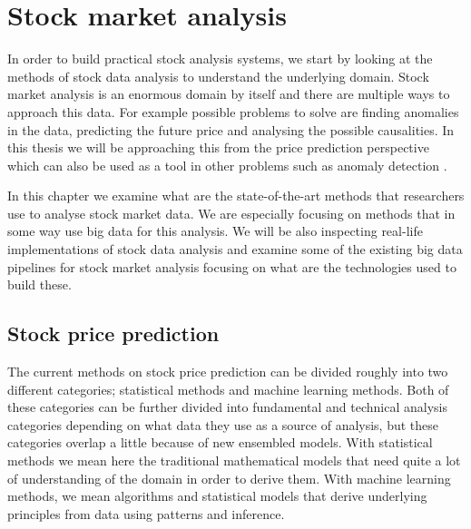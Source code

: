 \chapter{Stock market analysis}
\label{chapter:background} 



In order to build practical stock analysis systems, we start by looking at the methods of stock data analysis to understand the underlying domain.
Stock market analysis is an enormous domain by itself and there are multiple ways to approach this data.
For example possible problems to solve are finding anomalies in the data, predicting the future price and analysing the possible causalities.
In this thesis we will be approaching this from the price prediction perspective which can also be used as a tool in other problems such as anomaly detection \cite{islam}.

In this chapter we examine what are the state-of-the-art methods that researchers use to analyse stock market data.
We are especially focusing on methods that in some way use big data for this analysis.
We will be also inspecting real-life implementations of stock data analysis and examine some of the existing big data pipelines for stock market analysis focusing on what are the technologies used to build these.

\section{Stock price prediction}

The current methods on stock price prediction can be divided roughly into two different categories; statistical methods and machine learning methods.
Both of these categories can be further divided into fundamental and technical analysis categories depending on what data they use as a source of analysis, but these categories overlap a little because of new ensembled models.
With statistical methods we mean here the traditional mathematical models that need quite a lot of understanding of the domain in order to derive them.
With machine learning methods, we mean algorithms and statistical models that derive underlying principles from data using patterns and inference.

